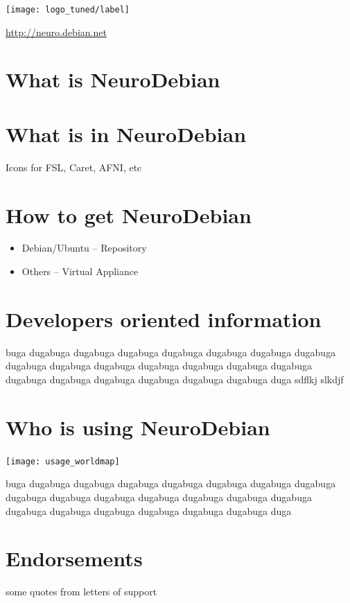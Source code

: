 \documentclass[letterpaper,landscape]{report}
\begin{document}
\begin{multicols}{3}    %

\begin{center}

\noindent
\texttt{[image: logo\_tuned/label]}

\url{http://neuro.debian.net}
\end{center}

\section*{What is NeuroDebian}

\section*{What is in NeuroDebian}

Icons for FSL, Caret, AFNI, etc


\columnbreak

\section*{How to get NeuroDebian}

\begin{itemize}
\item Debian/Ubuntu -- Repository
\item Others -- Virtual Appliance
\end{itemize}

\section*{Developers oriented information}

buga dugabuga dugabuga dugabuga dugabuga dugabuga dugabuga dugabuga dugabuga dugabuga dugabuga dugabuga dugabuga dugabuga dugabuga dugabuga dugabuga dugabuga dugabuga dugabuga dugabuga duga
sdflkj
slkdjf

\columnbreak

\section*{Who is using NeuroDebian}

\noindent
\texttt{[image: usage\_worldmap]}

buga dugabuga dugabuga dugabuga dugabuga dugabuga dugabuga dugabuga dugabuga dugabuga dugabuga dugabuga dugabuga dugabuga dugabuga dugabuga dugabuga dugabuga dugabuga dugabuga dugabuga duga

\section*{Endorsements}

some quotes from letters of support

\columnbreak
\end{multicols}
\end{document}
